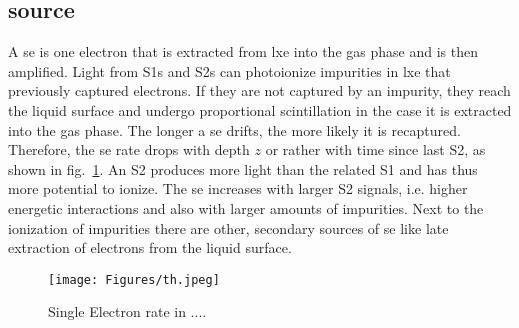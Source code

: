 
\FloatBarrier
\subsection{source}
\label{ssec:se-source}
\FloatBarrier


A \gls{se} is one electron that is extracted from \gls{lxe} into the gas phase and is then amplified.
Light from S1s and S2s can photoionize impurities in \gls{lxe} that previously captured electrons.
If they are not captured by an impurity, they reach the liquid surface and undergo proportional scintillation in the case it is extracted into the gas phase.
The longer a \gls{se} drifts, the more likely it is recaptured.
Therefore, the \gls{se} rate drops with depth $ z $ or rather with time since last S2, as shown in fig.~\ref{fig:se-rate}.  %
An S2 produces more light than the related S1 and has thus more potential to ionize.
The \gls{se} increases with larger S2 signals, i.e. higher energetic interactions and also with larger amounts of impurities\cite{}.  %
Next to the ionization of impurities there are other, secondary sources of \gls{se} like late extraction of electrons from the liquid surface.


\begin{figure}
    \centering
    \texttt{[image: Figures/th.jpeg]}  %
    \caption[Single Electron Rate in 1T/100/LUX]{
        Single Electron rate in ...\cite{}.
    }
    \label{fig:se-rate}
\end{figure}




